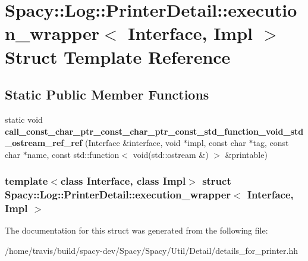 \hypertarget{structSpacy_1_1Log_1_1PrinterDetail_1_1execution__wrapper}{\section{\-Spacy\-:\-:\-Log\-:\-:\-Printer\-Detail\-:\-:execution\-\_\-wrapper$<$ \-Interface, \-Impl $>$ \-Struct \-Template \-Reference}
\label{structSpacy_1_1Log_1_1PrinterDetail_1_1execution__wrapper}
}
\subsection*{\-Static \-Public \-Member \-Functions}
\begin{DoxyCompactItemize}
\item 
\hypertarget{structSpacy_1_1Log_1_1PrinterDetail_1_1execution__wrapper_adc01d922b81e6c21d276570719e09f73}{static void {\bfseries call\-\_\-const\-\_\-char\-\_\-ptr\-\_\-const\-\_\-char\-\_\-ptr\-\_\-const\-\_\-std\-\_\-function\-\_\-void\-\_\-std\-\_\-ostream\-\_\-ref\-\_\-ref} (\-Interface \&interface, void $\ast$impl, const char $\ast$tag, const char $\ast$name, const std\-::function$<$ void(std\-::ostream \&) $>$ \&printable)}\label{structSpacy_1_1Log_1_1PrinterDetail_1_1execution__wrapper_adc01d922b81e6c21d276570719e09f73}

\end{DoxyCompactItemize}
\subsubsection*{template$<$class Interface, class Impl$>$ struct Spacy\-::\-Log\-::\-Printer\-Detail\-::execution\-\_\-wrapper$<$ Interface, Impl $>$}



\-The documentation for this struct was generated from the following file\-:\begin{DoxyCompactItemize}
\item 
/home/travis/build/spacy-\/dev/\-Spacy/\-Spacy/\-Util/\-Detail/details\-\_\-for\-\_\-printer.\-hh\end{DoxyCompactItemize}
